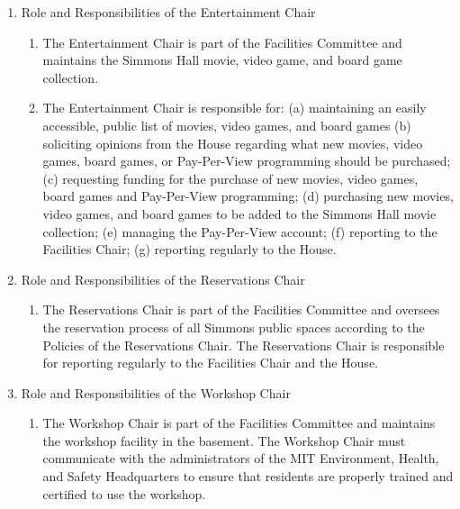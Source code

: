 \documentclass[letterpaper]{article}
\begin{document}
\begin{enumerate}
\begin{enumerate}
\begin{enumerate}
\end{enumerate}

\item Role and Responsibilities of the Entertainment Chair

\begin{enumerate}

\item The Entertainment Chair is part of the Facilities Committee and maintains the Simmons Hall movie, video game, and board game collection.

\item The Entertainment Chair is responsible for: (a) maintaining an easily accessible, public list of movies, video games, and board games (b) soliciting opinions from the House regarding what new movies, video games, board games, or Pay-Per-View programming should be purchased; (c) requesting funding for the purchase of new movies, video games, board games and Pay-Per-View programming; (d) purchasing new movies, video games, and board games to be added to the Simmons Hall movie collection; (e) managing the Pay-Per-View account; (f) reporting to the Facilities Chair; (g) reporting regularly to the House.

\end{enumerate}

\item Role and Responsibilities of the Reservations Chair

\begin{enumerate}

\item The Reservations Chair is part of the Facilities Committee and oversees the reservation process of all Simmons public spaces according to the Policies of the Reservations Chair. The Reservations Chair is responsible for reporting regularly to the Facilities Chair and the House.

\end{enumerate}

\item Role and Responsibilities of the Workshop Chair

\begin{enumerate}

\item The Workshop Chair is part of the Facilities Committee and maintains the workshop facility in the basement. The Workshop Chair must communicate with the administrators of the MIT Environment, Health, and Safety Headquarters to ensure that residents are properly trained and certified to use the workshop.


\end{enumerate}
\end{enumerate}
\end{enumerate}
\end{document}
